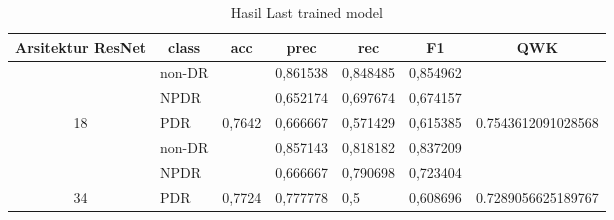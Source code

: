 \begin{table}[hbtp]
	\begin{center}
		\caption{Hasil Last trained model}
		\label{tb:HasilLastDefault}
		\begin{tabular}{|c|l|c|l|l|l|c|}
			\hline
			\rowcolor[HTML]{C0C0C0} 
			Arsitektur ResNet   & \multicolumn{1}{c|}{\cellcolor[HTML]{C0C0C0}class} & acc                      & \multicolumn{1}{c|}{\cellcolor[HTML]{C0C0C0}prec} & \multicolumn{1}{c|}{\cellcolor[HTML]{C0C0C0}rec} & \multicolumn{1}{c|}{\cellcolor[HTML]{C0C0C0}F1} & QWK                                  \\ \hline
			& non-DR                                             &                          & 0,861538                                          & 0,848485                                         & 0,854962                                        &                                      \\ \cline{2-2} \cline{4-6}
			& NPDR                                               &                          & 0,652174                                          & 0,697674                                         & 0,674157                                        &                                      \\ \cline{2-2} \cline{4-6}
			\multirow{-3}{*}{18}  & PDR                                                & \multirow{-3}{*}{0,7642} & 0,666667                                          & 0,571429                                         & 0,615385                                        & \multirow{-3}{*}{0.7543612091028568} \\ \hline
			& non-DR                                             &                          & 0,857143                                          & 0,818182                                         & 0,837209                                        &                                      \\ \cline{2-2} \cline{4-6}
			& NPDR                                               &                          & 0,666667                                          & 0,790698                                         & 0,723404                                        &                                      \\ \cline{2-2} \cline{4-6}
			\multirow{-3}{*}{34}  & PDR                                                & \multirow{-3}{*}{0,7724} & 0,777778                                          & 0,5                                              & 0,608696                                        & \multirow{-3}{*}{0.7289056625189767} \\ \hline

\end{tabular}
\end{center}
\end{table}
